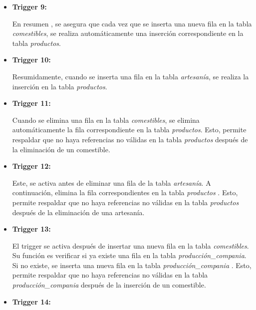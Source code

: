 \documentclass[11pt]{report}
\begin{document}
\begin{itemize}
      \item \textbf{Trigger 9:} 
            \lstset{style=mystyle}
            

En resumen , se asegura que cada vez que se inserta una nueva fila en la tabla \emph{comestibles}, se realiza automáticamente una inserción correspondiente en la tabla \emph{productos}. 

      \item \textbf{Trigger 10:} 
            \lstset{style=mystyle}
            

Resumidamente, cuando se inserta una fila en la tabla \emph{artesanía}, se realiza la inserción en la tabla \emph{productos}.

      \item \textbf{Trigger 11:} 
            \lstset{style=mystyle}
            

Cuando se elimina una fila en la tabla \emph{comestibles}, se elimina automáticamente la fila correspondiente en la tabla \emph{productos}. Esto, permite respaldar que no haya referencias no válidas en la tabla \emph{productos} después de la eliminación de un comestible.

      \item \textbf{Trigger 12:} 
            \lstset{style=mystyle}
            

Este, se activa antes de eliminar una fila de la tabla \emph{artesanía}. A continuación, elimina la fila correspondientes en la tabla \emph{productos }. Esto, permite respaldar que no haya referencias no válidas en la tabla \emph{productos} después de la eliminación de una artesanía.

      \item \textbf{Trigger 13:} 
            \lstset{style=mystyle}
            

El trigger se activa después de insertar una nueva fila en la tabla \emph{comestibles}. Su función es verificar si ya existe una fila en la tabla \emph{producción\_compania}. Si no existe, se inserta una nueva fila en la tabla \emph{producción\_compania} . Esto, permite respaldar que no haya referencias no válidas en la tabla \emph{producción\_compania} después de la inserción de un comestible.

      \item \textbf{Trigger 14:} 
            \lstset{style=mystyle}
            


\end{itemize}
\end{document}
